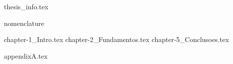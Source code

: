 \documentclass[portuguese,msc,fctuc]{uc-thesis}
\begin{document}
\frontmatter
\renewcommand{\chaptermark}[1]{\markboth{\thechapter.\ #1}{}}

{thesis_info.tex}

\makecover

\maketitlepage

\makededication

\makeacknowledgement

\makeabstract

\tableofcontents

\cleardoublepage

\listoffigures

\cleardoublepage

\listoftables


\listofacronyms

{nomenclature}
\printnomenclature

\mainmatter
\renewcommand{\chaptermark}[1]{\markboth{\thechapter.\ #1}{}}

{chapter-1_Intro.tex}
{chapter-2_Fundamentos.tex}
{chapter-5_Conclusoes.tex}





\appendix
{appendixA.tex}

\end{document}
